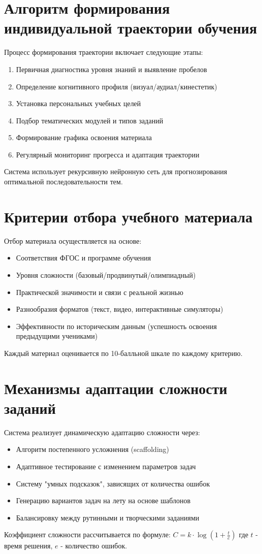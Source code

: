 \documentclass[a4paper,14pt]{extreport}
\begin{document}
\section{Алгоритм формирования индивидуальной траектории обучения}
Процесс формирования траектории включает следующие этапы:
\begin{enumerate}
    \item Первичная диагностика уровня знаний и выявление пробелов
    \item Определение когнитивного профиля (визуал/аудиал/кинестетик)
    \item Установка персональных учебных целей
    \item Подбор тематических модулей и типов заданий
    \item Формирование графика освоения материала
    \item Регулярный мониторинг прогресса и адаптация траектории
\end{enumerate}
Система использует рекурсивную нейронную сеть для прогнозирования оптимальной последовательности тем.

\section{Критерии отбора учебного материала}
Отбор материала осуществляется на основе:
\begin{itemize}
    \item Соответствия ФГОС и программе обучения
    \item Уровня сложности (базовый/продвинутый/олимпиадный)
    \item Практической значимости и связи с реальной жизнью
    \item Разнообразия форматов (текст, видео, интерактивные симуляторы)
    \item Эффективности по историческим данным (успешность освоения предыдущими учениками)
\end{itemize}
Каждый материал оценивается по 10-балльной шкале по каждому критерию.

\section{Механизмы адаптации сложности заданий}
Система реализует динамическую адаптацию сложности через:
\begin{itemize}
    \item Алгоритм постепенного усложнения (scaffolding)
    \item Адаптивное тестирование с изменением параметров задач
    \item Систему "умных подсказок", зависящих от количества ошибок
    \item Генерацию вариантов задач на лету на основе шаблонов
    \item Балансировку между рутинными и творческими заданиями
\end{itemize}
Коэффициент сложности рассчитывается по формуле: $C = k \cdot \log(1 + \frac{t}{e})$ где $t$ - время решения, $e$ - количество ошибок.
\end{document}
